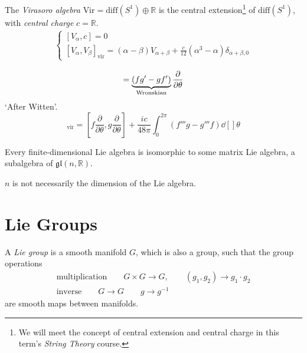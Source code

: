 \begin{example}
  The \emph{Virasoro algebra} $\text{Vir} = \text{diff}(S^1) \oplus \mathbb{R}$ is the central extension\footnote{We will meet the concept of central extension and central charge in this term's \emph{String Theory} course.} of $\text{diff}(S^1)$, with \emph{central charge} $c = \mathbb{R}$.
  \begin{align}
    \left\{
    \begin{gathered}
      [V_{\alpha}, c] = 0 \\
      [V_{\alpha}, V_{\beta}]_{\text{vir}} = (\alpha - \beta) V_{\alpha + \beta} + \frac{c}{12} (\alpha^3 - \alpha) \delta_{\alpha + \beta, 0}
    \end{gathered}
    \right.
  \end{align}
  \begin{remark}
    \begin{equation}
      [f(\theta) \frac{\partial }{\partial \theta}, g(\theta) \frac{\partial }{\partial \theta}] = \underbrace{(f g' - g f')}_{\mathclap{\text{Wronskian}}} \frac{\partial }{\partial \theta}
    \end{equation}
    `After Witten'.
    \begin{equation}
      [f \frac{\partial }{\partial \theta}, g \frac{\partial }{\partial \theta}]_{\text{vir}} = [f \frac{\partial }{\partial \theta}, g \frac{\partial }{\partial \theta}] + \frac{i c}{48 \pi} \int_0^{2 \pi} (f''' g - g''' f) \dd[]{\theta}
    \end{equation}
  \end{remark}
\end{example}

\begin{theorem}[Ado]
  Every finite-dimensional Lie algebra is isomorphic to some matrix Lie algebra, a subalgebra of $\mathfrak{gl}(n, \mathbb{R})$.
\end{theorem}
\begin{leftbar}
  \begin{remark}
    $n$ is not necessarily the dimension of the Lie algebra.
  \end{remark}
\end{leftbar}

\chapter{Lie Groups}%
\label{cha:lie_groups}

\begin{definition}
  A \emph{Lie group} is a smooth manifold $G$, which is also a group, such that the group operations
  \begin{gather}
    \text{multiplication} \qquad G \times G \to G, \qquad (g_1, g_2) \to g_1 \cdot g_2 \\
    \text{inverse} \qquad G \to G \qquad g \to g^{-1}
  \end{gather}
  are smooth maps between manifolds.
\end{definition}

